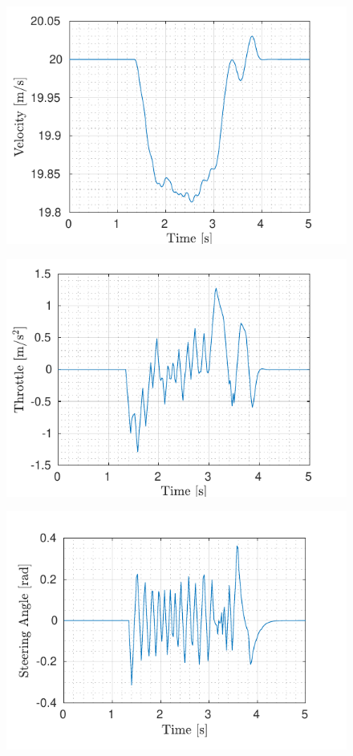 \begin{figure}[!t]
\begin{minipage}[t]{0.5\textwidth}
		\includegraphics[width=\textwidth]{../../MATLAB/one_obstacle_right_overtaking/figure/VelocityVsTime.pdf}
		\subcaption{}\label{fig:velocity_one_moving}
	\end{minipage}
	\begin{minipage}[t]{0.5\textwidth}
		\includegraphics[width=\textwidth]{../../MATLAB/one_obstacle_right_overtaking/figure/ThrottleVsTime.pdf}
		\subcaption{}\label{fig:throttle_one_moving}
	\end{minipage}
	\begin{minipage}[t]{0.5\textwidth}
		\includegraphics[width=\textwidth]{../../MATLAB/one_obstacle_right_overtaking/figure/SteeringAngleVsTime.pdf}

\end{minipage}
\end{figure}
